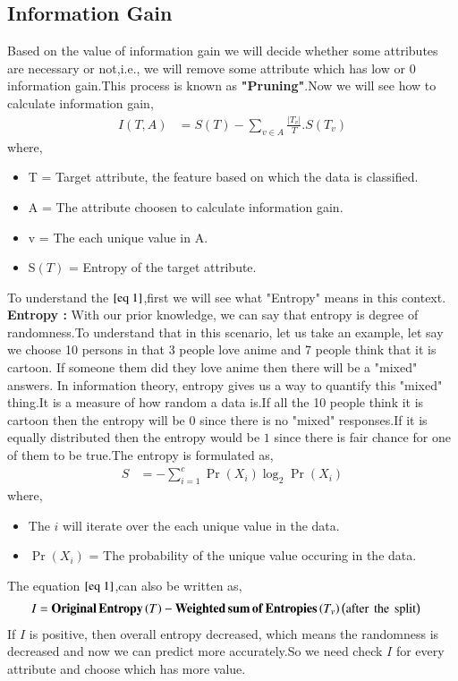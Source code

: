 \documentclass[journal,12pt,onecolumn]{IEEEtran}
\providecommand{\pr}[1]{\ensuremath{\Pr\left(#1\right)}}
\providecommand{\brak}[1]{\ensuremath{\left(#1\right)}}
\theoremstyle{remark}
\providecommand{\abs}[1]{\left\vert#1\right\vert}
\numberwithin{equation}{section}
\begin{document}
              \subsection{Information Gain}
               Based on the value of information gain we will decide whether some attributes are necessary or not,i.e., we will remove some attribute which has low or $0$ information gain.This process is known as \textbf{"Pruning"}.Now we will see how to calculate information gain,
	    \begin{align}
		    I\brak{T,A} &= S\brak{T} - \sum_{v\in A}\frac{\abs{T_v}}{T}.S\brak{T_v}\label{eq 1}
	    \end{align}
	    where,
	    \begin{itemize}
	      \item T = Target attribute, the feature based on which the data is classified.
              \item A = The attribute choosen to calculate information gain.
	      \item v = The each unique value in A.
              \item S\brak{T} = Entropy of the target attribute. 
            \end{itemize}
       To understand the $\eqref{eq 1}$,first we will see what "Entropy" means in this context.\\
       \textbf{Entropy :} With our prior knowledge, we can say that entropy is degree of randomness.To understand that in this scenario, let us take an example, let say
	we choose 10 persons in that 3 people love anime and 7 people think that it is cartoon. If someone them did they love anime then there will be a "mixed" answers.
	In information theory, entropy gives us a way to quantify this "mixed" thing.It is a measure of how random a data is.If all the 10 people think it is cartoon then the entropy will be $0$ since there is no "mixed" responses.If it is equally distributed then the entropy would be $1$ since there is fair chance for one of them to be true.The entropy is formulated as,
	    \begin{align}
		    S &= -\sum_{i=1}^{c}\pr{X_i}\log_2\pr{X_i}
	    \end{align}
	where,
	\begin{itemize}
         \item The $i$ will iterate over the each unique value in the data.
         \item \pr{X_i} = The probability of the unique value occuring in the data.
        \end{itemize}
	The equation $\eqref{eq 1}$,can also be written as,
	        \begin{align}
			I &= \mathbf{Original\,Entropy}\brak{T} -\mathbf{Weighted\, sum \,of\, Entropies}\brak{T_v}\brak{\text{after\, the\, split}}
		\end{align}
         If $I$ is positive, then overall entropy decreased, which means the randomness is decreased and now we can predict more accurately.So we need check $I$ for every attribute and choose which has more value.
\end{document}
